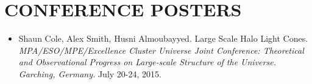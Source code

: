 \section{CONFERENCE POSTERS}
\begin{itemize}

\item Shaun Cole, Alex Smith, Husni Almoubayyed. Large Scale Halo Light Cones. {\sl MPA/ESO/MPE/Excellence Cluster Universe Joint Conference: Theoretical and Observational Progress on Large-scale Structure of the Universe. Garching, Germany.} \hfill  July 20-24, 2015.
\end{itemize}